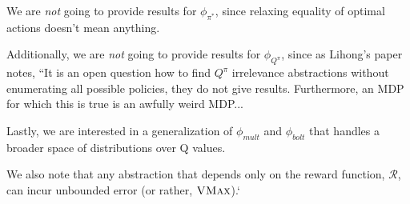 We are {\it not} going to provide results for $\phi_{\pi^*}$, since relaxing equality of optimal actions doesn't mean anything.

Additionally, we are {\it not} going to provide results for $\phi_{Q^\pi}$, since as Lihong's paper notes, ``It is an open question how to find $Q^\pi$ irrelevance abstractions without enumerating all possible policies, they do not give results. Furthermore, an MDP for which this is true is an awfully weird MDP...

Lastly, we are interested in a generalization of $\phi_{mult}$  and $\phi_{bolt}$ that handles a broader space of distributions over Q values.

We also note that any abstraction that depends only on the reward function, $\mathcal{R}$, can incur unbounded error (or rather, $\textsc{VMax}$).`



